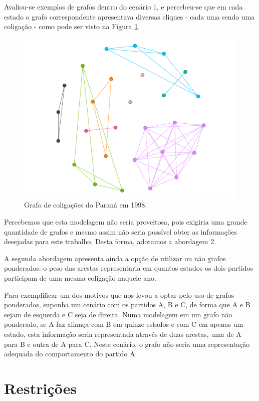 Avaliou-se exemplos de grafos dentro do cenário 1, e percebeu-se que em cada estado o grafo correspondente apresentava diversas cliques - cada uma sendo uma coligação - como pode ser visto na Figura \ref{grafo-parana-1998}.

\begin{figure}[H]
\centering
\includegraphics[width=1\textwidth]{img/parana-1998.png}
\caption{Grafo de coligações do Paraná em 1998.}
\label{grafo-parana-1998}
\end{figure}

Percebemos que esta modelagem não seria proveitosa, pois exigiria uma grande quantidade de grafos e mesmo assim não seria possível obter as informações desejadas para este trabalho. Desta forma, adotamos a abordagem 2.

A segunda abordagem apresenta ainda a opção de utilizar ou não grafos ponderados: o peso das arestas representaria em quantos estados os dois partidos participam de uma mesma coligação naquele ano.

Para exemplificar um dos motivos que nos levou a optar pelo uso de grafos ponderados, suponha um cenário com os partidos A, B e C, de forma que A e B sejam de esquerda e C seja de direita. Numa modelagem em um grafo não ponderado, se A faz aliança com B em quinze estados e com C em apenas um estado, esta informação seria representada através de duas arestas, uma de A para B e outra de A para C. Neste cenário, o grafo não seria uma representação adequada do comportamento do partido A.

\section{Restrições}
\label{proposta__restricoes}

